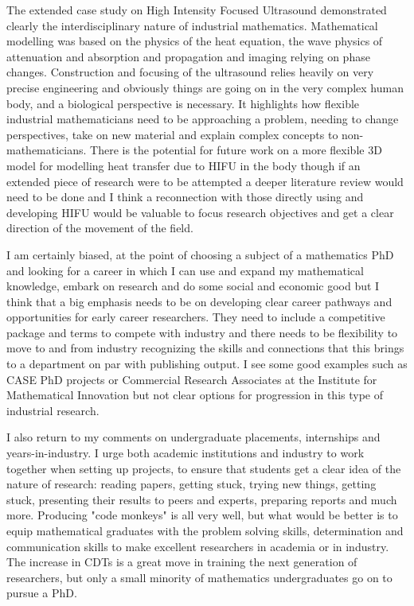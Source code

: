 \documentclass[11pt]{article} %
\begin{document}
The extended case study on High Intensity Focused Ultrasound demonstrated clearly the interdisciplinary nature of industrial mathematics. Mathematical modelling was based on the physics of the heat equation, the  wave physics of attenuation and absorption and propagation and imaging relying on phase changes. Construction and focusing of the ultrasound relies heavily on very precise engineering and obviously things are going on in the very complex human body, and a biological perspective is necessary. It highlights how flexible industrial mathematicians need to be approaching a problem, needing to change perspectives, take on new material and explain complex concepts to non-mathematicians. 
There is the potential for future work on a more flexible 3D model for modelling heat transfer due to HIFU in the body though if an extended piece of research were to be attempted a deeper literature review would need to be done and I think a reconnection with those directly using and developing HIFU would be valuable to focus research objectives and get a clear direction of the movement of the field. 

I am certainly biased, at the point of choosing a subject of a mathematics PhD and looking for a career in which I can use and expand my mathematical knowledge, embark on research and do some social and economic good but I think that a big emphasis needs to be on developing clear career pathways and opportunities for early career researchers. They need to include a competitive package and terms to compete with industry and there needs to be flexibility to move to and from industry recognizing the skills and connections that this brings to a department on par with publishing output. I see some good examples such as CASE PhD projects or  Commercial Research Associates at the Institute for Mathematical Innovation but not clear options for progression in this type of industrial research. 

I also return to my comments on undergraduate placements, internships and years-in-industry. I urge both academic institutions and industry to work together when setting up projects, to ensure that students get a clear idea of the nature of research: reading papers, getting stuck, trying new things, getting stuck, presenting their results to peers and experts, preparing reports and much more. Producing "code monkeys" is all very well, but what would be better is to equip mathematical graduates with the problem solving skills, determination and communication skills to make excellent researchers in academia or in industry. The increase in CDTs is a great move in training the next generation of researchers, but only a small minority of mathematics undergraduates go on to pursue a PhD. 
\end{document}
